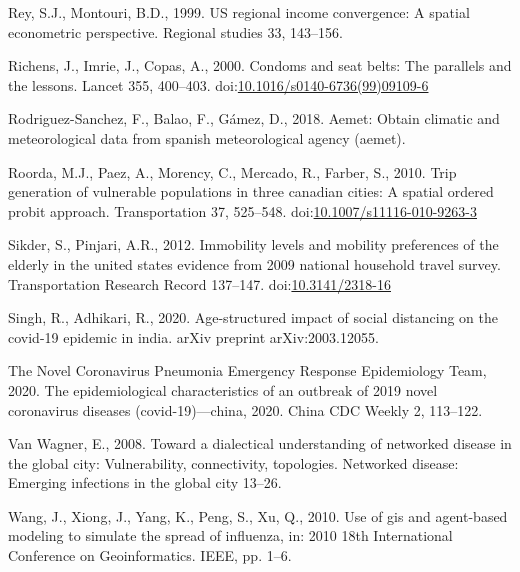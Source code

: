 \documentclass[]{elsarticle} %
\begin{document}
\leavevmode\hypertarget{ref-Rey1999us}{}%
Rey, S.J., Montouri, B.D., 1999. US regional income convergence: A
spatial econometric perspective. Regional studies 33, 143--156.

\leavevmode\hypertarget{ref-Richens2000risk}{}%
Richens, J., Imrie, J., Copas, A., 2000. Condoms and seat belts: The
parallels and the lessons. Lancet 355, 400--403.
doi:\href{https://doi.org/10.1016/s0140-6736(99)09109-6}{10.1016/s0140-6736(99)09109-6}

\leavevmode\hypertarget{ref-Rodriguez2018aemet}{}%
Rodriguez-Sanchez, F., Balao, F., Gámez, D., 2018. Aemet: Obtain
climatic and meteorological data from spanish meteorological agency
(aemet).

\leavevmode\hypertarget{ref-Roorda2010trip}{}%
Roorda, M.J., Paez, A., Morency, C., Mercado, R., Farber, S., 2010. Trip
generation of vulnerable populations in three canadian cities: A spatial
ordered probit approach. Transportation 37, 525--548.
doi:\href{https://doi.org/10.1007/s11116-010-9263-3}{10.1007/s11116-010-9263-3}

\leavevmode\hypertarget{ref-Sikder2012immobility}{}%
Sikder, S., Pinjari, A.R., 2012. Immobility levels and mobility
preferences of the elderly in the united states evidence from 2009
national household travel survey. Transportation Research Record
137--147. doi:\href{https://doi.org/10.3141/2318-16}{10.3141/2318-16}

\leavevmode\hypertarget{ref-Singh2020age}{}%
Singh, R., Adhikari, R., 2020. Age-structured impact of social
distancing on the covid-19 epidemic in india. arXiv preprint
arXiv:2003.12055.

\leavevmode\hypertarget{ref-Novel2020epidemiological}{}%
The Novel Coronavirus Pneumonia Emergency Response Epidemiology Team,
2020. The epidemiological characteristics of an outbreak of 2019 novel
coronavirus diseases (covid-19)---china, 2020. China CDC Weekly 2,
113--122.

\leavevmode\hypertarget{ref-vanWagner2008toward}{}%
Van Wagner, E., 2008. Toward a dialectical understanding of networked
disease in the global city: Vulnerability, connectivity, topologies.
Networked disease: Emerging infections in the global city 13--26.

\leavevmode\hypertarget{ref-Wang2010gis}{}%
Wang, J., Xiong, J., Yang, K., Peng, S., Xu, Q., 2010. Use of gis and
agent-based modeling to simulate the spread of influenza, in: 2010 18th
International Conference on Geoinformatics. IEEE, pp. 1--6.
\end{document}
